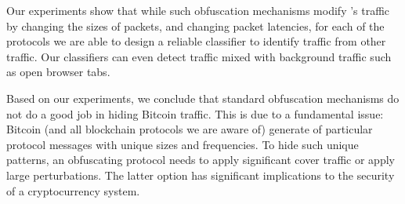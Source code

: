 Our experiments show that while such obfuscation mechanisms modify \bc's traffic by changing the sizes of packets, and changing packet latencies, for each of the protocols we are able to design a reliable classifier to identify \bc traffic from other traffic. 
Our classifiers can even detect \bc traffic mixed with background traffic such as open browser tabs.


Based on our experiments, we conclude that standard obfuscation mechanisms do not do a good job in hiding Bitcoin traffic. 
This is due to a fundamental issue: Bitcoin (and all blockchain protocols we are aware of) generate of particular protocol messages with unique sizes and frequencies. To hide such unique patterns, an obfuscating protocol needs to apply significant cover traffic or apply large perturbations. 
The latter option has significant implications to the security of a cryptocurrency system.

 
 
 




